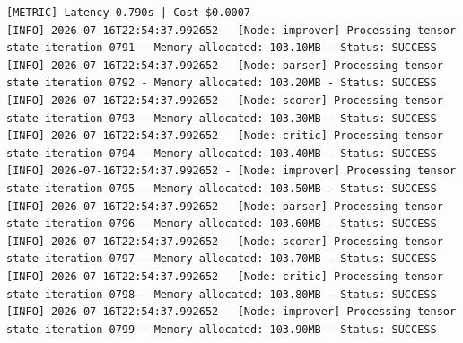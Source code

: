 \documentclass[10pt,journal,compsoc]{IEEEtran}
\begin{document}
\begin{verbatim}
[METRIC] Latency 0.790s | Cost $0.0007
[INFO] 2026-07-16T22:54:37.992652 - [Node: improver] Processing tensor state iteration 0791 - Memory allocated: 103.10MB - Status: SUCCESS
[INFO] 2026-07-16T22:54:37.992652 - [Node: parser] Processing tensor state iteration 0792 - Memory allocated: 103.20MB - Status: SUCCESS
[INFO] 2026-07-16T22:54:37.992652 - [Node: scorer] Processing tensor state iteration 0793 - Memory allocated: 103.30MB - Status: SUCCESS
[INFO] 2026-07-16T22:54:37.992652 - [Node: critic] Processing tensor state iteration 0794 - Memory allocated: 103.40MB - Status: SUCCESS
[INFO] 2026-07-16T22:54:37.992652 - [Node: improver] Processing tensor state iteration 0795 - Memory allocated: 103.50MB - Status: SUCCESS
[INFO] 2026-07-16T22:54:37.992652 - [Node: parser] Processing tensor state iteration 0796 - Memory allocated: 103.60MB - Status: SUCCESS
[INFO] 2026-07-16T22:54:37.992652 - [Node: scorer] Processing tensor state iteration 0797 - Memory allocated: 103.70MB - Status: SUCCESS
[INFO] 2026-07-16T22:54:37.992652 - [Node: critic] Processing tensor state iteration 0798 - Memory allocated: 103.80MB - Status: SUCCESS
[INFO] 2026-07-16T22:54:37.992652 - [Node: improver] Processing tensor state iteration 0799 - Memory allocated: 103.90MB - Status: SUCCESS
\end{verbatim}
\end{document}
